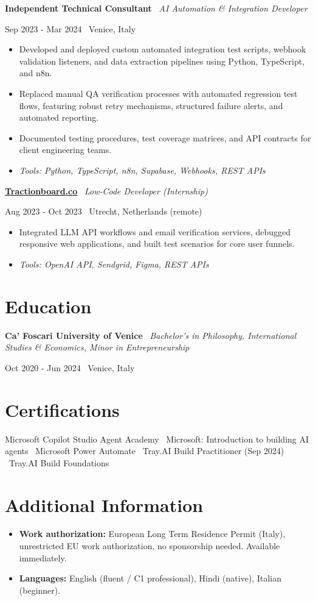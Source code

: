 \documentclass[a4paper,10pt]{article}
\newcommand{\role}[4]{%
 \vspace{2pt}\noindent
 \begin{minipage}[t]{0.70\textwidth}\raggedright\textbf{#1} \textbullet\ \textit{#3}\end{minipage}%
 \hfill
 \begin{minipage}[t]{0.28\textwidth}\raggedleft\footnotesize\color{gray}#2 \textbullet\ #4\end{minipage}%
 \vspace{1pt}%
}
\begin{document}
\role{Independent Technical Consultant}{Sep 2023 - Mar 2024}{AI Automation \& Integration Developer}{Venice, Italy}
\begin{itemize}
 \item Developed and deployed custom automated integration test scripts, webhook validation listeners, and data extraction pipelines using Python, TypeScript, and n8n.
 \item Replaced manual QA verification processes with automated regression test flows, featuring robust retry mechanisms, structured failure alerts, and automated reporting.
 \item Documented testing procedures, test coverage matrices, and API contracts for client engineering teams.
 \item \textit{Tools: Python, TypeScript, n8n, Supabase, Webhooks, REST APIs}
\end{itemize}

\role{\href{https://tractionboard.co}{Tractionboard.co}}{Aug 2023 - Oct 2023}{Low-Code Developer (Internship)}{Utrecht, Netherlands (remote)}
\begin{itemize}
 \item Integrated LLM API workflows and email verification services, debugged responsive web applications, and built test scenarios for core user funnels.
 \item \textit{Tools: OpenAI API, Sendgrid, Figma, REST APIs}
\end{itemize}

\section{Education}
\role{Ca' Foscari University of Venice}{Oct 2020 - Jun 2024}{Bachelor's in Philosophy, International Studies \& Economics, Minor in Entrepreneurship}{Venice, Italy}

\section{Certifications}
Microsoft Copilot Studio Agent Academy \textbullet\ Microsoft: Introduction to building AI agents \textbullet\ Microsoft Power Automate \textbullet\ Tray.AI Build Practitioner (Sep 2024) \textbullet\ Tray.AI Build Foundations

\section{Additional Information}
\begin{itemize}
 \item \textbf{Work authorization:} European Long Term Residence Permit (Italy), unrestricted EU work authorization, no sponsorship needed. Available immediately.
 \item \textbf{Languages:} English (fluent / C1 professional), Hindi (native), Italian (beginner).
\end{itemize}
\end{document}
